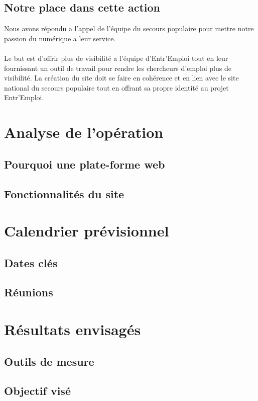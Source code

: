 \documentclass[12pt]{report}
\begin{document}
\section{Notre place dans cette action}
Nous avons répondu a l'appel de l'équipe du secours populaire pour mettre notre passion du numérique a leur service.\\
\\
Le but est d'offrir plus de visibilité a l'équipe d'Entr'Emploi tout en leur fournissant un outil de travail pour rendre les chercheurs d'emploi plus de visibilité. 
La création du site doit se faire en cohérence et en lien avec le site national du secours populaire tout en offrant sa propre identité au projet Entr'Emploi.\\

\chapter{Analyse de l’opération}
\thispagestyle{fancy}
\section{Pourquoi une plate-forme web}
\section{Fonctionnalités du site}

\chapter{Calendrier prévisionnel}
\thispagestyle{fancy}
\section{Dates clés}
\section{Réunions}

\chapter{Résultats envisagés}
\thispagestyle{fancy}
\section{Outils de mesure}
\section{Objectif visé}
\end{document}
